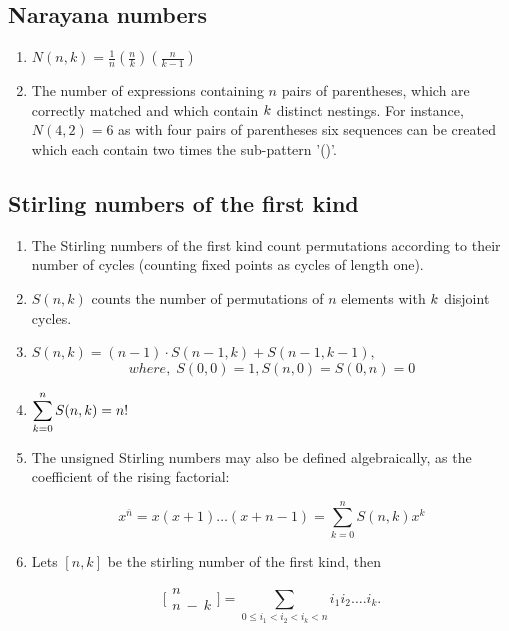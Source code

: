 \subsection{Narayana numbers}
\begin{enumerate}
\item $N(n,k)=\frac{1}{n}\left(\frac{n}{k}\right)\left(\frac{n}{k-1}\right)$
\item The number of expressions containing $n$ pairs of parentheses, which are correctly matched and which contain $\displaystyle \displaystyle k$ distinct nestings. For instance, $N(4, 2) = 6$ as with four pairs of parentheses six sequences can be created which each contain two times the sub-pattern '()'.
\end{enumerate}

\subsection{Stirling numbers of the first kind}
\begin{enumerate}
\item The Stirling numbers of the first kind count permutations according to their number of cycles (counting fixed points as cycles of length one).
\item $S(n,k)$ counts the number of permutations of $n$ elements with $\displaystyle \displaystyle k$ disjoint cycles.
\item $S(n,k)=(n-1) \cdot S(n-1,k)+S(n-1,k-1),$
    $$where,\; S(0,0)=1,S(n,0)=S(0,n)=0$$
\item $\displaystyle \displaystyle\sum_{k=0}^{n}S(n,k) = n!$
\item The unsigned Stirling numbers may also be defined algebraically, as the coefficient of the rising factorial:
    
    $$\displaystyle x^{\bar{n}} = x(x+1) \ldots (x+n-1) = \sum_{k=0}^{n}{ S(n, k) x^k}$$
\item Lets $[n, k]$ be the stirling number of the first kind, then 
     
     $$\displaystyle \bigl[\!\begin{smallmatrix} n \\ n\ -\ k \end{smallmatrix}\!\bigr] = \sum_{0 \leq i_1 < i_2 < i_k < n}{i_1i_2 \ldots .i_k.}$$
\end{enumerate}

